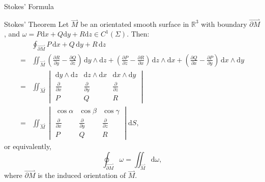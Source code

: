 \documentclass[11pt]{../../TexTemplate/elegantbook}
\begin{document}
\begin{leftbarTitle}{Stokes' Formula}\end{leftbarTitle}
\begin{theorem}{Stokes' Theorem}
    Let \(\overset{\rightharpoonup}{M}\) be an orientated smooth surface in \(\mathbb{R}^{3}\)
    with boundary \(\overset{\rightharpoonup}{\partial M}\),
    and \(\omega = P\mathrm{d}x + Q \mathrm{d}y + R \mathrm{d}z \in C^{1}(\Sigma)\).
    Then:
    \begin{align*}
        &\oint_{\overset{\rightharpoonup}{\partial M}} P \, \mathrm{d}x + Q \, \mathrm{d}y + R \, \mathrm{d}z\\
        =& \iint_{\overset{\rightharpoonup}{M}} \left( 
            \frac{\partial R}{\partial y} - \frac{\partial Q}{\partial z}
        \right) \, \mathrm{d}y \wedge \mathrm{d}z +
        \left( 
            \frac{\partial P}{\partial z} - \frac{\partial R}{\partial x}
        \right) \, \mathrm{d}z \wedge \mathrm{d}x +
        \left(
            \frac{\partial Q}{\partial x} - \frac{\partial P}{\partial y}
        \right) \, \mathrm{d}x \wedge \mathrm{d}y \\
        =& \iint_{\overset{\rightharpoonup}{M}} 
            \begin{vmatrix}\mathrm{d}y \wedge \mathrm{d}z&\mathrm{d}z \wedge \mathrm{d}x& \mathrm{d}x \wedge \mathrm{d}y\\
            \frac{\partial }{\partial x}&\frac{\partial }{\partial y}&\frac{\partial }{\partial z}\\
            P&Q&R            
            \end{vmatrix}\\
        =&\iint_{\overset{\rightharpoonup}{M}} 
        \begin{vmatrix}\cos\alpha&\cos\beta&\cos\gamma \\
        \frac{\partial }{\partial x}&\frac{\partial }{\partial y}&\frac{\partial }{\partial z}\\
        P&Q&R
        \end{vmatrix} \mathrm{d}S,
    \end{align*}
    or equivalently,
    \[
    \oint_{\overset{\rightharpoonup}{\partial M}} \omega = \iint_{\overset{\rightharpoonup}{M}} \mathrm{d}\omega,
    \]
    where \(\overset{\rightharpoonup}{\partial M}\) is the induced orientation of \(\overset{\rightharpoonup}{M}\).
\end{theorem}
\end{document}
